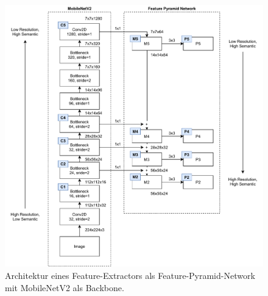 \begin{figure}
    \includegraphics[width=\textwidth]{images/MobileNetV2_FPN.pdf}
    \caption{Architektur eines Feature-Extractors als Feature-Pyramid-Network
    mit MobileNetV2 als Backbone.}
    \label{fig:mobilenetv2-fpn}
\end{figure}
